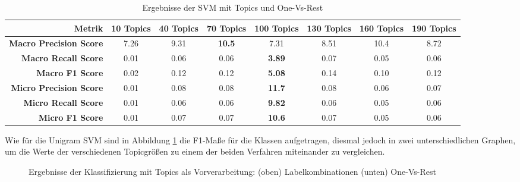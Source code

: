 \begin{table}[h]
    \begin{tabular}{r|ccccccc}
        \tiny\textbf{Metrik} & \tiny\textbf{10 Topics} &\tiny \textbf{40 Topics} &\tiny \textbf{70 Topics} &\tiny \textbf{100 Topics} & \tiny \textbf{130 Topics} &  \tiny \textbf{160 Topics} &  \tiny \textbf{190 Topics} \\
        \hline
        \tiny \textbf{Macro Precision Score}  & \tiny 7.26& \tiny 9.31& \tiny \textbf{10.5}&\tiny 7.31&\tiny 8.51&\tiny 10.4&\tiny 8.72\\
        \tiny \textbf{Macro Recall Score}     & \tiny 0.01& \tiny 0.06& \tiny 0.06&\tiny \textbf{3.89}&\tiny 0.07&\tiny 0.05&\tiny 0.06\\
        \tiny \textbf{Macro F1 Score}        & \tiny 0.02& \tiny 0.12& \tiny 0.12&\tiny \textbf{5.08}&\tiny 0.14&\tiny 0.10&\tiny 0.12\\
        \tiny \textbf{Micro Precision Score} & \tiny 0.01& \tiny 0.08& \tiny 0.08&\tiny \textbf{11.7}&\tiny 0.08&\tiny 0.06&\tiny 0.07\\
        \tiny \textbf{Micro Recall Score}    & \tiny 0.01& \tiny 0.06& \tiny 0.06&\tiny \textbf{9.82}&\tiny 0.06&\tiny 0.05&\tiny 0.06\\
        \tiny \textbf{Micro F1 Score}        & \tiny 0.01& \tiny 0.07& \tiny 0.07&\tiny \textbf{10.6}&\tiny 0.07&\tiny 0.05&\tiny 0.06\\
    \end{tabular}
    \caption{Ergebnisse der SVM mit Topics und One-Vs-Rest}
    \label{tab:topics_svm_ovr}
\end{table}

Wie für die Unigram SVM sind in Abbildung \ref{fig:svm_topic_eval} die F1-Maße für die Klassen aufgetragen,
diesmal jedoch in zwei unterschiedlichen Graphen, um die Werte der verschiedenen Topicgrößen zu einem der beiden Verfahren miteinander
zu vergleichen.


\begin{figure}[H]
    \centering
    \def\svgwitdth{0.1\columnwidth}
    
    \caption{Ergebnisse der Klassifizierung mit Topics als Vorverarbeitung: (oben) Labelkombinationen (unten) One-Vs-Rest}
    \label{fig:svm_topic_eval}
\end{figure}
